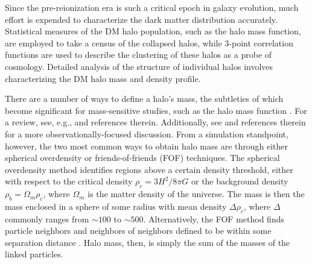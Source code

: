 

Since the pre-reionization era is such a critical epoch in galaxy evolution, much effort is expended to characterize the dark matter distribution accurately.  Statistical measures of the DM halo population, such as the halo mass function, are employed to take a census of the collapsed halos, while 3-point correlation functions are used to describe the clustering of these halos as a probe of cosmology.  Detailed analysis of the structure of individual halos involves characterizing the DM halo mass and density profile.

There are a number of ways to define a halo's mass, the subtleties of which become significant for mass-sensitive studies, such as the halo mass function \citep{1974ApJ...187..425P, 2007MNRAS.374....2R, 2006ApJ...642L..85H, 2007ApJ...671.1160L}.  For a review, see, e.g., \citet{2001A&A...367...27W} and references therein.  Additionally, see \citet{2005RvMP...77..207V} and references therein for a more observationally-focused discussion.  From a simulation standpoint, however, the two most common ways to obtain halo mass are through either spherical overdensity or friends-of-friends (FOF) techniques.  The spherical overdensity method identifies regions above a certain density threshold, either with respect to the critical density $\rho_{c} = 3 H^{2} / 8 \pi G$ or the background density $\rho_{b} = \Omega_{m} \rho_{c}$, where $\Omega_{m}$ is the matter density of the universe.  The mass is then the mass enclosed in a sphere of some radius with mean density $\Delta \rho_{c}$, where $\Delta$ commonly ranges from $\sim 100$ to $\sim 500$.  Alternatively, the FOF method finds particle neighbors and neighbors of neighbors defined to be within some separation distance \citep{1984MNRAS.206..529E, 1985ApJ...292..371D}.  Halo mass, then, is simply the sum of the masses of the linked particles.

